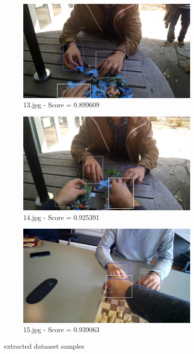 \begin{figure}
    \centering
    \begin{subfigure}[b]{0.3 \textwidth}
        \centering
        \includegraphics[width=\textwidth]{images/handDetection/13.jpg}
        \caption{13.jpg - Score = 0.899609}
        
    \end{subfigure}
    \hfill
    \begin{subfigure}[b]{0.3\textwidth}
        \centering
        \includegraphics[width=\textwidth]{images/handDetection/14.jpg}
        \caption{14.jpg - Score = 0.925391}
        
    \end{subfigure}
    \begin{subfigure}[b]{0.3\textwidth}
        \centering
        \includegraphics[width=\textwidth]{images/handDetection/15.jpg}
        \caption{15.jpg - Score = 0.939063}
       
    \end{subfigure}
       \caption{extracted dataaset samples}
       
\end{figure}

